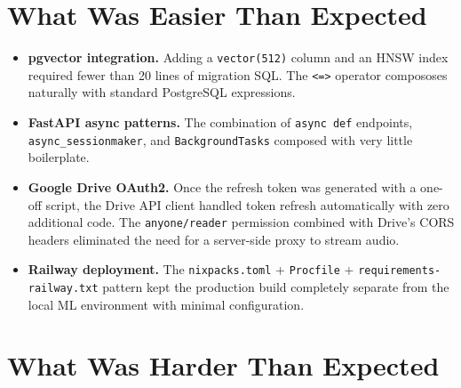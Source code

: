 \documentclass[12pt,letterpaper]{report}
\begin{document}
\section{What Was Easier Than Expected}

\begin{itemize}
  \item \textbf{pgvector integration.} Adding a \texttt{vector(512)} column and an HNSW index required fewer than 20 lines of migration SQL. The \texttt{<=>} operator compososes naturally with standard PostgreSQL expressions.
  \item \textbf{FastAPI async patterns.} The combination of \texttt{async def} endpoints, \texttt{async\_sessionmaker}, and \texttt{BackgroundTasks} composed with very little boilerplate.
  \item \textbf{Google Drive OAuth2.} Once the refresh token was generated with a one-off script, the Drive API client handled token refresh automatically with zero additional code. The \texttt{anyone/reader} permission combined with Drive's CORS headers eliminated the need for a server-side proxy to stream audio.
  \item \textbf{Railway deployment.} The \texttt{nixpacks.toml} + \texttt{Procfile} + \texttt{requirements-railway.txt} pattern kept the production build completely separate from the local ML environment with minimal configuration.
\end{itemize}

\section{What Was Harder Than Expected}
\end{document}
